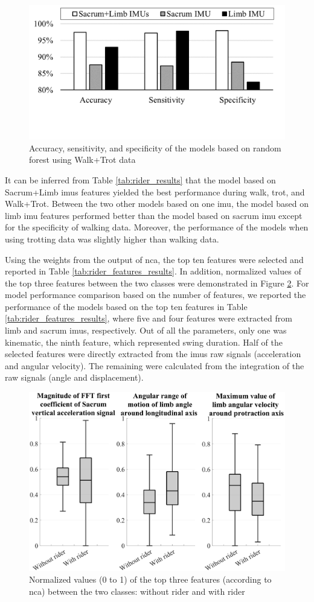 \begin{figure}[htbp]
\centering
\includegraphics[width=.8\linewidth]{chapters/rider/figures/Picture5.png}
\caption{Accuracy, sensitivity, and specificity of the models based on random forest using Walk+Trot data}
\label{fig:rider_five}
\end{figure}

It can be inferred from Table \ref{tab:rider_results} that the model based on Sacrum+Limb \gls{imu}s features yielded the best performance during walk, trot, and Walk+Trot. Between the two other models based on one \gls{imu}, the model based on limb \gls{imu} features performed better than the model based on sacrum \gls{imu} except for the specificity of walking data. Moreover, the performance of the models when using trotting data was slightly higher than walking data.



Using the weights from the output of \gls{nca}, the top ten features were selected and reported in Table \ref{tab:rider_features_results}. In addition, normalized values of the top three features between the two classes were demonstrated in Figure \ref{fig:rider_six}. For model performance comparison based on the number of features, we reported the performance of the models based on the top ten features in Table \ref{tab:rider_features_results}, where five and four features were extracted from limb and sacrum \gls{imu}s, respectively. Out of all the parameters, only one was kinematic, the ninth feature, which represented swing duration. Half of the selected features were directly extracted from the \gls{imu}s raw signals (acceleration and angular velocity). The remaining were calculated from the integration of the raw signals (angle and displacement). 

\begin{figure}[htbp]
\centering
\includegraphics[width=.75\linewidth]{chapters/rider/figures/Picture6.png}
\caption{Normalized values (0 to 1) of the top three features (according to \gls{nca}) between the two classes: without rider and with rider}
\label{fig:rider_six}
\end{figure}
